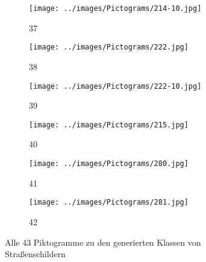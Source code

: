 \begin{figure}[H]
\begin{subfigure}[b]{0.1\textwidth}
\end{subfigure}
\hspace{3em}%
\begin{subfigure}[b]{0.1\textwidth}
\centering
\texttt{[image: ../images/Pictograms/214-10.jpg]}
\caption{37}
\end{subfigure}
\hspace{3em}%
\begin{subfigure}[b]{0.1\textwidth}
\centering
\texttt{[image: ../images/Pictograms/222.jpg]}
\caption{38}
\end{subfigure}
\hspace{3em}%
\begin{subfigure}[b]{0.1\textwidth}
\centering
\texttt{[image: ../images/Pictograms/222-10.jpg]}
\caption{39}
\end{subfigure}
\hspace{3em}%
\begin{subfigure}[b]{0.1\textwidth}
\centering
\texttt{[image: ../images/Pictograms/215.jpg]}
\caption{40}
\end{subfigure}
\hspace{3em}%
\begin{subfigure}[b]{0.1\textwidth}
\centering
\texttt{[image: ../images/Pictograms/280.jpg]}
\caption{41}
\end{subfigure}
\hspace{3em}%
\begin{subfigure}[b]{0.1\textwidth}
\centering
\texttt{[image: ../images/Pictograms/281.jpg]}
\caption{42}
\end{subfigure}
      \caption{Alle 43 Piktogramme zu den generierten Klassen von Straßenschildern \cite{piktogramme}}
      \label{fig:all-pictograms}
\end{figure}

